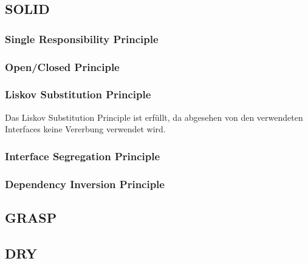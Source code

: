 \subsection{SOLID}
\subsubsection{Single Responsibility Principle}

\subsubsection{Open/Closed Principle}

\subsubsection{Liskov Substitution Principle}
Das Liskov Substitution Principle ist erfüllt, da abgesehen von den verwendeten Interfaces keine Vererbung verwendet wird.
\subsubsection{Interface Segregation Principle}

\subsubsection{Dependency Inversion Principle}

\subsection{GRASP}

\subsection{DRY}
